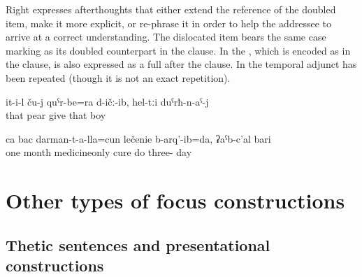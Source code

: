 Right  expresses afterthoughts that either extend the reference of the doubled item, make it more explicit, or re-phrase it in order to help the addressee to arrive at a correct understanding. The dislocated item bears the same case marking as its doubled counterpart in the clause. In  the , which is encoded as  in the clause, is also expressed as a full  after the clause. In  the temporal adjunct has been repeated (though it is not an exact repetition).
%
\begin{exe}
	\ex	\label{ex:He gave them pears, to the boys_IS}
	\gll	it-i-l	ču-j	quˁr-be=ra	d-ičː-ib,	hel-tːi	duˁrħ-n-aˁ-j\\
		that		pear	give	that	boy\\
	\glt	{}

	\ex	\label{ex:‎For one month I was cured only with pills, for 30 days_IS}
	\gll	ca	bac	darman-t-a-lla=cun	lečenie	b-arq'-ib=da,	ʡaˁb-c'al	bari\\
		one	month	medicineonly	cure	do three-	day\\
	\glt	{}
\end{exe}



\section{Other types of focus constructions}
\label{sec:Other types of focus constructions}



\subsection{Thetic sentences and presentational constructions}
\label{ssec:Thetic sentences and presentational constructions}

